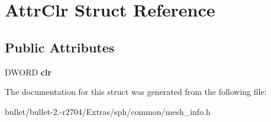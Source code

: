 \hypertarget{struct_attr_clr}{\section{Attr\+Clr Struct Reference}
\label{struct_attr_clr}
}
\subsection*{Public Attributes}
\begin{DoxyCompactItemize}
\item 
\hypertarget{struct_attr_clr_ab03b82c1080baa6b4aab847f137b7bec}{D\+W\+O\+R\+D {\bfseries clr}}\label{struct_attr_clr_ab03b82c1080baa6b4aab847f137b7bec}

\end{DoxyCompactItemize}


The documentation for this struct was generated from the following file\+:\begin{DoxyCompactItemize}
\item 
bullet/bullet-\/2.-\/r2704/\+Extras/sph/common/mesh\+\_\+info.\+h\end{DoxyCompactItemize}
